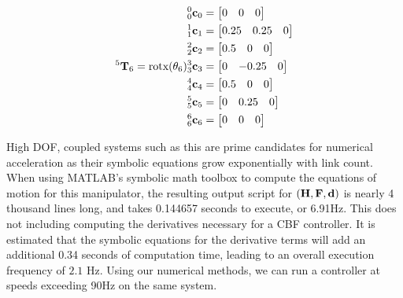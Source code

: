 \begin{align*}
\begin{split}
        {^5 \mathbf{T}_6} &= \text{rotx}(\theta_6)\\
    \end{split}
    \begin{split}
    \end{split}
    \begin{split}
        {^0_0 \mathbf{c}_0} &= \begin{bmatrix} 0& 0& 0 \end{bmatrix}\\
        {^1_1 \mathbf{c} _1} &= \begin{bmatrix} 0.25& 0.25& 0 \end{bmatrix}\\
        {^2_2 \mathbf{c} _2} &= \begin{bmatrix} 0.5& 0& 0 \end{bmatrix}\\
        {^3_3 \mathbf{c} _3} &= \begin{bmatrix} 0& -0.25& 0\end{bmatrix}\\
        {^4_4 \mathbf{c} _4} &= \begin{bmatrix} 0.5& 0& 0 \end{bmatrix}\\
        {^5_5 \mathbf{c} _5} &= \begin{bmatrix} 0 & 0.25 & 0\end{bmatrix}\\
        {^6_6 \mathbf{c} _6} &= \begin{bmatrix} 0 & 0 & 0\end{bmatrix}\\
    \end{split}
\end{align*}

\noindent High DOF, coupled systems such as this are prime candidates for numerical acceleration as their symbolic equations grow exponentially with link count. When using MATLAB's symbolic math toolbox to compute the equations of motion for this manipulator, the resulting output script for $({\mathbf{H}}, {\mathbf{F}}, {\mathbf{d}})$ is nearly 4 thousand lines long, and takes 0.144657 seconds to execute, or 6.91Hz. This does not including computing the derivatives necessary for a CBF controller. It is estimated that the symbolic equations for the derivative terms will add an additional 0.34 seconds of computation time, leading to an overall execution frequency of $2.1$ Hz. Using our numerical methods, we can run a controller at speeds exceeding 90Hz on the same system. \newline

